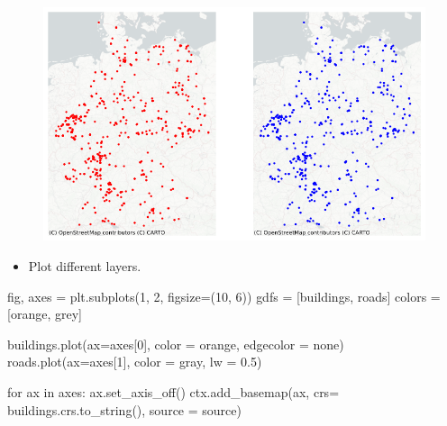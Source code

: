 \documentclass[
  letterpaper,
  DIV=11,
  numbers=noendperiod]{scrreprt}
\newenvironment{Shaded}{\begin{snugshade}}{\end{snugshade}}
\newcommand{\ControlFlowTok}[1]{\textcolor[rgb]{0.00,0.23,0.31}{#1}}
\newcommand{\DecValTok}[1]{\textcolor[rgb]{0.68,0.00,0.00}{#1}}
\newcommand{\FloatTok}[1]{\textcolor[rgb]{0.68,0.00,0.00}{#1}}
\newcommand{\KeywordTok}[1]{\textcolor[rgb]{0.00,0.23,0.31}{#1}}
\newcommand{\NormalTok}[1]{\textcolor[rgb]{0.00,0.23,0.31}{#1}}
\newcommand{\OperatorTok}[1]{\textcolor[rgb]{0.37,0.37,0.37}{#1}}
\newcommand{\StringTok}[1]{\textcolor[rgb]{0.13,0.47,0.30}{#1}}
\providecommand{\tightlist}{%
  \setlength{\itemsep}{0pt}\setlength{\parskip}{0pt}}\usepackage{longtable,booktabs,array}
\begin{document}
\begin{figure}[H]

{\centering \includegraphics{labs/w02_maps_files/figure-pdf/cell-20-output-1.png}

}

\end{figure}

\begin{itemize}
\tightlist
\item
  Plot different layers.
\end{itemize}

\begin{Shaded}
\begin{Highlighting}[]
\NormalTok{fig, axes }\OperatorTok{=}\NormalTok{ plt.subplots(}\DecValTok{1}\NormalTok{, }\DecValTok{2}\NormalTok{, figsize}\OperatorTok{=}\NormalTok{(}\DecValTok{10}\NormalTok{, }\DecValTok{6}\NormalTok{))}
\NormalTok{gdfs }\OperatorTok{=}\NormalTok{ [buildings, roads]}
\NormalTok{colors }\OperatorTok{=}\NormalTok{ [}\StringTok{\textquotesingle{}orange\textquotesingle{}}\NormalTok{, }\StringTok{\textquotesingle{}grey\textquotesingle{}}\NormalTok{]}

\NormalTok{buildings.plot(ax}\OperatorTok{=}\NormalTok{axes[}\DecValTok{0}\NormalTok{], color }\OperatorTok{=} \StringTok{\textquotesingle{}orange\textquotesingle{}}\NormalTok{, edgecolor }\OperatorTok{=} \StringTok{\textquotesingle{}none\textquotesingle{}}\NormalTok{)}
\NormalTok{roads.plot(ax}\OperatorTok{=}\NormalTok{axes[}\DecValTok{1}\NormalTok{], color }\OperatorTok{=} \StringTok{\textquotesingle{}gray\textquotesingle{}}\NormalTok{, lw }\OperatorTok{=} \FloatTok{0.5}\NormalTok{)}

\ControlFlowTok{for}\NormalTok{ ax }\KeywordTok{in}\NormalTok{ axes:}
\NormalTok{    ax.set\_axis\_off()}
\NormalTok{    ctx.add\_basemap(ax, crs}\OperatorTok{=}\NormalTok{ buildings.crs.to\_string(), source }\OperatorTok{=}\NormalTok{ source)}
\end{Highlighting}
\end{Shaded}
\end{document}
